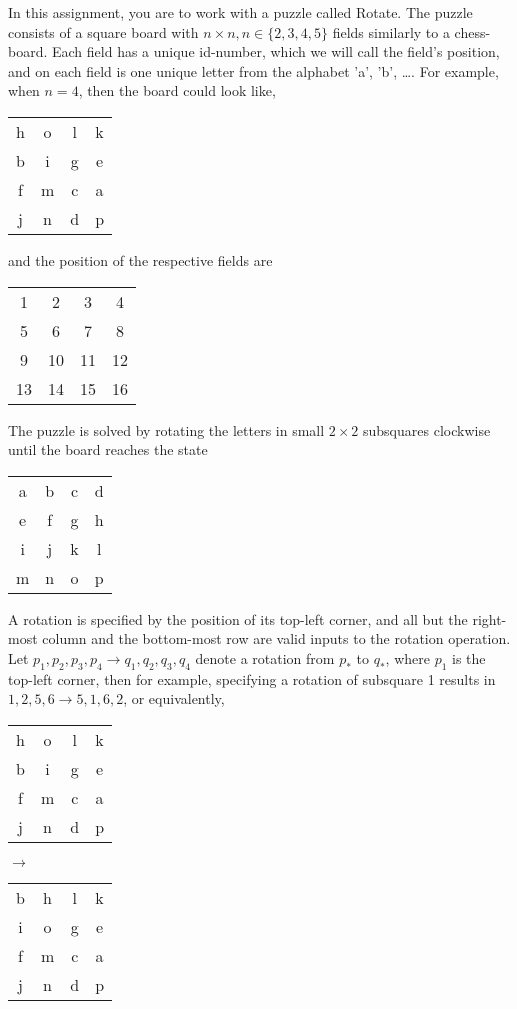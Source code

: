 In this assignment, you are to work with a puzzle called Rotate. The puzzle consists of a square board with $n\times n, n \in \{2, 3, 4, 5\}$ fields similarly to a chess-board. Each field has a unique id-number, which we will call the field's position, and on each field is one unique letter from the alphabet 'a', 'b', \dots. For example, when $n=4$, then the board could look like,
\begin{center}
  \begin{tabular}{cccc}
     h &o &l &k
     \\b &i &g &e
     \\f &m &c &a
     \\j &n &d &p
  \end{tabular}
\end{center}
and the position of the respective fields are
\begin{center}
  \begin{tabular}{cccc}
    1  &2  &3  &4
    \\ 5  &6  &7  &8
    \\ 9 &10 &11 &12
    \\13 &14 &15 &16
  \end{tabular}
\end{center}
The puzzle is solved by rotating the letters in small $2\times 2$ subsquares clockwise until the board reaches the state
\begin{center}
  \begin{tabular}{cccc}
    a &b &c &d
    \\ e &f &g &h
    \\ i &j &k &l
    \\ m &n &o &p
  \end{tabular}
\end{center}
A rotation is specified by the position of its top-left corner, and all but the right-most column and the bottom-most row are valid inputs to the rotation operation. Let $p_1, p_2, p_3, p_4 \rightarrow q_1, q_2, q_3, q_4$ denote a rotation from $p_*$ to $q_*$, where $p_1$ is the top-left corner, then for example, specifying a rotation of subsquare 1 results in $1, 2, 5, 6\rightarrow 5, 1, 6, 2$, or equivalently,
\begin{center}
  \begin{tabular}{cccc}
     h &o &l &k
     \\b &i &g &e
     \\f &m &c &a
     \\j &n &d &p
  \end{tabular}
  $\rightarrow$
  \begin{tabular}{cccc}
     b &h &l &k
     \\i &o &g &e
     \\f &m &c &a
     \\j &n &d &p
  \end{tabular}
\end{center}
